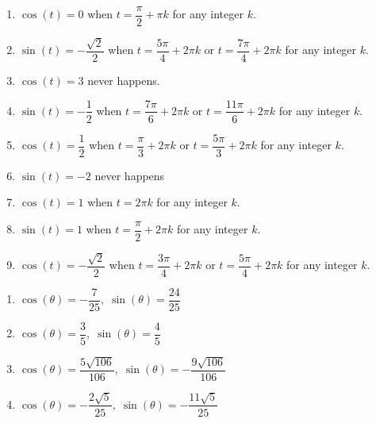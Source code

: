 \begin{enumerate}

\setcounter{enumi}{\value{HW}}

\item $\cos(t) = 0$ when $t = \dfrac{\pi}{2} + \pi k$ for any integer $k$.
\item $\sin(t) = -\dfrac{\sqrt{2}}{2}$ when $t = \dfrac{5\pi}{4} + 2\pi k$ or $t = \dfrac{7\pi}{4} + 2\pi k$ for any integer $k$.
\item $\cos(t) = 3$ never happens.  
\item $\sin(t) = -\dfrac{1}{2}$ when $t = \dfrac{7\pi}{6} + 2\pi k$ or $t = \dfrac{11\pi}{6} + 2\pi k$ for any integer $k$.
\item $\cos(t) = \dfrac{1}{2}$ when $t = \dfrac{\pi}{3} + 2\pi k$ or $t = \dfrac{5\pi}{3} + 2\pi k$ for any integer $k$.
\item $\sin(t) = -2$ never happens
\item $\cos(t) = 1$ when $t = 2\pi k$ for any integer $k$.
\item $\sin(t) = 1$ when $t = \dfrac{\pi}{2} + 2\pi k$ for any integer $k$.
\item $\cos(t) = -\dfrac{\sqrt{2}}{2}$ when $t = \dfrac{3\pi}{4} + 2\pi k$ or $t = \dfrac{5\pi}{4} + 2\pi k$ for any integer $k$.

\setcounter{HW}{\value{enumi}}

\end{enumerate}

\begin{enumerate}

\setcounter{enumi}{\value{HW}}

\item $\cos(\theta) = -\dfrac{7}{25}, \; \sin(\theta) = \dfrac{24}{25}$

\item $\cos(\theta) = \dfrac{3}{5}, \; \sin(\theta) = \dfrac{4}{5}$

\item $\cos(\theta) = \dfrac{5\sqrt{106}}{106}, \; \sin(\theta) = -\dfrac{9\sqrt{106}}{106}$

\item $\cos(\theta) = -\dfrac{2\sqrt{5}}{25}, \; \sin(\theta) = -\dfrac{11\sqrt{5}}{25}$

\setcounter{HW}{\value{enumi}}

\end{enumerate}


